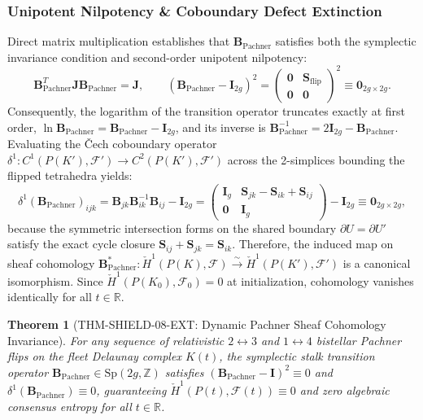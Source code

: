 \documentclass[11pt,onecolumn]{article}
\newtheorem{theorem}{Theorem}
\begin{document}
\subsubsection{Unipotent Nilpotency \& Coboundary Defect Extinction}
Direct matrix multiplication establishes that $\mathbf{B}_{\mathrm{Pachner}}$ satisfies both the symplectic invariance condition and second-order unipotent nilpotency:
\begin{equation}
\mathbf{B}_{\mathrm{Pachner}}^T \mathbf{J} \mathbf{B}_{\mathrm{Pachner}} = \mathbf{J}, \qquad \left(\mathbf{B}_{\mathrm{Pachner}} - \mathbf{I}_{2g}\right)^2 = \begin{pmatrix} \mathbf{0} & \mathbf{S}_{\mathrm{flip}} \\ \mathbf{0} & \mathbf{0} \end{pmatrix}^2 \equiv \mathbf{0}_{2g \times 2g}.
\end{equation}
Consequently, the logarithm of the transition operator truncates exactly at first order, $\ln \mathbf{B}_{\mathrm{Pachner}} = \mathbf{B}_{\mathrm{Pachner}} - \mathbf{I}_{2g}$, and its inverse is $\mathbf{B}_{\mathrm{Pachner}}^{-1} = 2\mathbf{I}_{2g} - \mathbf{B}_{\mathrm{Pachner}}$. Evaluating the \v{C}ech coboundary operator $\delta^1: C^1(P(K'), \mathcal{F}') \to C^2(P(K'), \mathcal{F}')$ across the 2-simplices bounding the flipped tetrahedra yields:
\begin{equation}
\delta^1\left(\mathbf{B}_{\mathrm{Pachner}}\right)_{ijk} = \mathbf{B}_{jk} \mathbf{B}_{ik}^{-1} \mathbf{B}_{ij} - \mathbf{I}_{2g} = \begin{pmatrix} \mathbf{I}_g & \mathbf{S}_{jk} - \mathbf{S}_{ik} + \mathbf{S}_{ij} \\ \mathbf{0} & \mathbf{I}_g \end{pmatrix} - \mathbf{I}_{2g} \equiv \mathbf{0}_{2g \times 2g},
\end{equation}
because the symmetric intersection forms on the shared boundary $\partial U = \partial U'$ satisfy the exact cycle closure $\mathbf{S}_{ij} + \mathbf{S}_{jk} = \mathbf{S}_{ik}$. Therefore, the induced map on sheaf cohomology $\mathbf{B}_{\mathrm{Pachner}}^*: \check{H}^1(P(K), \mathcal{F}) \xrightarrow{\sim} \check{H}^1(P(K'), \mathcal{F}')$ is a canonical isomorphism. Since $\check{H}^1(P(K_0), \mathcal{F}_0) = 0$ at initialization, cohomology vanishes identically for all $t \in \mathbb{R}$.

\begin{theorem}[THM-SHIELD-08-EXT: Dynamic Pachner Sheaf Cohomology Invariance]
\label{thm:thm_shield_08_ext}
For any sequence of relativistic $2 \leftrightarrow 3$ and $1 \leftrightarrow 4$ bistellar Pachner flips on the fleet Delaunay complex $K(t)$, the symplectic stalk transition operator $\mathbf{B}_{\mathrm{Pachner}} \in \mathrm{Sp}(2g, \mathbb{Z})$ satisfies $(\mathbf{B}_{\mathrm{Pachner}} - \mathbf{I})^2 \equiv 0$ and $\delta^1(\mathbf{B}_{\mathrm{Pachner}}) \equiv 0$, guaranteeing $\check{H}^1(P(t), \mathcal{F}(t)) \equiv 0$ and zero algebraic consensus entropy for all $t \in \mathbb{R}$.
\end{theorem}
\FloatBarrier
\end{document}
